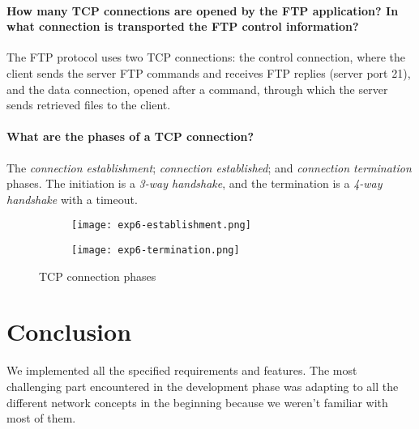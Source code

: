 \documentclass[compilation.tex]{subfiles}
\begin{document}
\paragraph{How many TCP connections are opened by the FTP application? In what connection is transported the FTP control information?}
The FTP protocol uses two TCP connections: the control connection, where the client sends the server FTP commands and receives FTP replies (server port 21), and the data connection, opened after a  command, through which the server sends retrieved files to the client.

\paragraph{What are the phases of a TCP connection?}
The \textsl{connection establishment}; \textsl{connection established}; and \textsl{connection termination} phases. The initiation is a \textit{3-way handshake}, and the termination is a \textit{4-way handshake} with a timeout.

\begin{figure}[hbt]
\centering
\begin{subfigure}[b]{\textwidth}
	\centering
	\texttt{[image: exp6-establishment.png]}
	\vspace*{.8\baselineskip}
\end{subfigure}
\begin{subfigure}[b]{\textwidth}
	\centering
	\texttt{[image: exp6-termination.png]}
	\vspace*{.8\baselineskip}
\end{subfigure}
\caption{TCP connection phases}
\label{fig:exp6-phases}
\end{figure}


\section{Conclusion}
\label{sec:conclusion}
We implemented all the specified requirements and features. The most challenging part encountered in the development phase was adapting to all the different network concepts in the beginning because we weren’t familiar with most of them.
\end{document}
